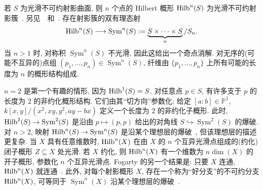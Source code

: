 \begin{example}\label{src:2.5.3}
若 $S$ 为光滑不可约射影曲面, 则 $n$ 个点的 Hilbert 概形 $\operatorname{Hilb}^n(S)$ 为光滑不可约射影簇~\cite{Fog68}.
另见~\cite{Nak99a}~和~\cite[\S$4$]{Mac07}.
存在射影簇的双有理态射
\[
\operatorname{Hilb}^n(S)\longrightarrow\operatorname{Sym}^n(S):=
\underbrace{S\times\cdots\times S}_{n}/S_n.
\]
当 $n>1$ 时, 对称积 $\operatorname{Sym}^n(S)$ 不光滑, 因此这给出一个奇点消解.
对无序的(可能不互异的)点组 $(p_1,\ldots,p_n)\in\operatorname{Sym}^n(S)$, 纤维由 $\{p_1,\ldots,p_n\}$ 上所有可能的长度为 $n$ 的概形结构组成.

$n=2$ 是第一个有趣的情形, 因为 $\operatorname{Hilb}^1(S)=S$.
对任意点 $p\in S$, 有许多支于 $p$ 的长度为 $2$ 的非约化概形结构.
它们由其``切方向''参数化: 给定 $[a:b]\in\mathbb P^1$, 
$k[x,y]/(x^2,xy,y^2,ay-bx)$ 定义一个长度为 $2$ 的非约化子概形.
此时, $\operatorname{Hilb}^2(S)\to\operatorname{Sym}^2(S)$ 是沿由 $p\mapsto(p,p)$ 给出的对角线 $S\hookrightarrow\operatorname{Sym}^2(S)$ 的爆破.
对 $n>2$, 映射 $\operatorname{Hilb}^n(S)\to\operatorname{Sym}^n(S)$ 是沿某个理想层的爆破~\cite{Hai98}, 但该理想层的描述更复杂.
当 $X$ 具有任意维数时, $\operatorname{Hilb}^n(X)$ 在由 $X$ 的 $n$ 个互异光滑点组成的(约化)闭子概形 $Z\subseteq X$ 处光滑.
若 $X$ 约化, 则 $\operatorname{Hilb}^n(X)$ 有一个维数为 $n\dim(X)$ 的开子概形, 参数化 $n$ 个互异光滑点.
Fogarty 的另一个结果是: 只要 $X$ 连通, $\operatorname{Hilb}^n(X)$ 就连通~\cite{Fog68}.
此外, 对每个射影概形 $X$, 存在一个称为``好分支''的不可约分支 $\operatorname{Hilb}^n(X)$, 可等同于 $\operatorname{Sym}^n(X)$ 沿某个理想层的爆破~\cite{ES14}.
\end{example}
